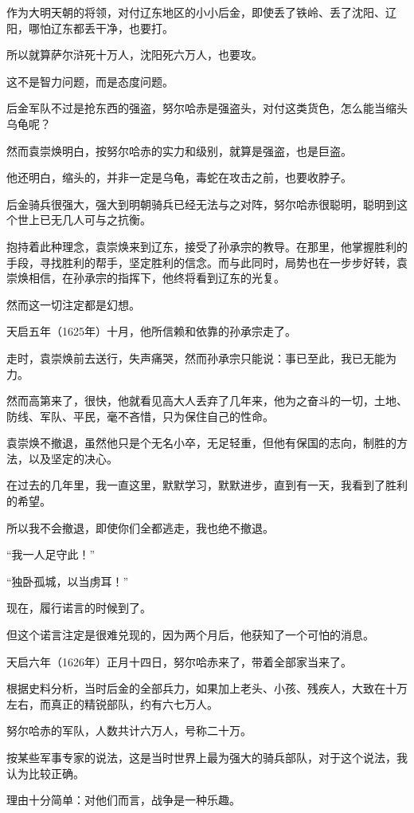 \begin{multicols}{\theparacolNo}
作为大明天朝的将领，对付辽东地区的小小后金，即使丢了铁岭、丢了沈阳、辽阳，哪怕辽东都丢干净，也要打。

所以就算萨尔浒死十万人，沈阳死六万人，也要攻。

这不是智力问题，而是态度问题。

后金军队不过是抢东西的强盗，努尔哈赤是强盗头，对付这类货色，怎么能当缩头乌龟呢？

然而袁崇焕明白，按努尔哈赤的实力和级别，就算是强盗，也是巨盗。

他还明白，缩头的，并非一定是乌龟，毒蛇在攻击之前，也要收脖子。

后金骑兵很强大，强大到明朝骑兵已经无法与之对阵，努尔哈赤很聪明，聪明到这个世上已无几人可与之抗衡。

抱持着此种理念，袁崇焕来到辽东，接受了孙承宗的教导。在那里，他掌握胜利的手段，寻找胜利的帮手，坚定胜利的信念。而与此同时，局势也在一步步好转，袁崇焕相信，在孙承宗的指挥下，他终将看到辽东的光复。

然而这一切注定都是幻想。

天启五年（1625年）十月，他所信赖和依靠的孙承宗走了。

走时，袁崇焕前去送行，失声痛哭，然而孙承宗只能说：事已至此，我已无能为力。

然而高第来了，很快，他就看见高大人丢弃了几年来，他为之奋斗的一切，土地、防线、军队、平民，毫不吝惜，只为保住自己的性命。

袁崇焕不撤退，虽然他只是个无名小卒，无足轻重，但他有保国的志向，制胜的方法，以及坚定的决心。

在过去的几年里，我一直这里，默默学习，默默进步，直到有一天，我看到了胜利的希望。

所以我不会撤退，即使你们全都逃走，我也绝不撤退。

“我一人足守此！”

“独卧孤城，以当虏耳！”

现在，履行诺言的时候到了。

但这个诺言注定是很难兑现的，因为两个月后，他获知了一个可怕的消息。

天启六年（1626年）正月十四日，努尔哈赤来了，带着全部家当来了。

根据史料分析，当时后金的全部兵力，如果加上老头、小孩、残疾人，大致在十万左右，而真正的精锐部队，约有六七万人。

努尔哈赤的军队，人数共计六万人，号称二十万。

按某些军事专家的说法，这是当时世界上最为强大的骑兵部队，对于这个说法，我认为比较正确。

理由十分简单：对他们而言，战争是一种乐趣。


\end{multicols}
